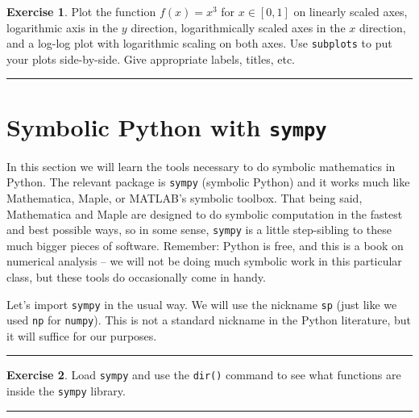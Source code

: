 \documentclass[
]{book}
\theoremstyle{definition}
\theoremstyle{definition}
\theoremstyle{definition}
\newtheorem{exercise}{Exercise}[chapter]
\theoremstyle{remark}
\begin{document}
\begin{exercise}
\protect\hypertarget{exr:unnamed-chunk-770}{}{\label{exr:unnamed-chunk-770} }Plot the function \(f(x) = x^3\) for \(x \in [0,1]\) on linearly scaled axes, logarithmic axis in the \(y\) direction, logarithmically scaled axes in the \(x\) direction, and a log-log plot with logarithmic scaling on both axes. Use \texttt{subplots} to put your plots side-by-side. Give appropriate labels, titles, etc.
\end{exercise}

\begin{center}\rule{0.5\linewidth}{0.5pt}\end{center}

\hypertarget{symbolic-python-with-sympy}{%
\section{\texorpdfstring{Symbolic Python with \texttt{sympy}}{Symbolic Python with sympy}}\label{symbolic-python-with-sympy}}

In this section we will learn the tools necessary to do symbolic mathematics in Python. The relevant package is \texttt{sympy} (symbolic Python) and it works much like Mathematica, Maple, or MATLAB's symbolic toolbox. That being said, Mathematica and Maple are designed to do symbolic computation in the fastest and best possible ways, so in some sense, \texttt{sympy} is a little step-sibling to these much bigger pieces of software. Remember: Python is free, and this is a book on numerical analysis -- we will not be doing much symbolic work in this particular class, but these tools do occasionally come in handy.

Let's import \texttt{sympy} in the usual way. We will use the nickname \texttt{sp} (just like we used \texttt{np} for \texttt{numpy}). This is not a standard nickname in the Python literature, but it will suffice for our purposes.

\begin{center}\rule{0.5\linewidth}{0.5pt}\end{center}

\begin{exercise}
\protect\hypertarget{exr:unnamed-chunk-771}{}{\label{exr:unnamed-chunk-771} }Load \texttt{sympy} and use the \texttt{dir()} command to see what functions are inside the \texttt{sympy} library.
\end{exercise}

\begin{center}\rule{0.5\linewidth}{0.5pt}\end{center}
\end{document}
